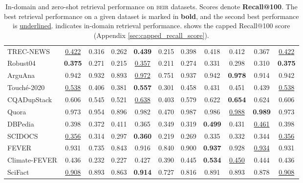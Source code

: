 \documentclass{article}
\newcommand{\custo}[1]{\textsc{\normalsize #1}}
\newcommand{\beir}{\custo{beir}\xspace}
\begin{document}
\begin{table*}[t!]
{\begin{tabular}{l | c | c c c | c c c c | c | c}
   TREC-NEWS     & \underline{0.422} & 0.316 & 0.262 & \textbf{0.439} & 0.215 & 0.398 & 0.418 & 0.412 & 0.367 & \underline{0.422} \\
   Robust04      & \textbf{0.375} & 0.271 & 0.215 & \underline{0.357} & 0.211 & 0.274 & 0.331 & 0.298 & 0.310 & \textbf{0.375} \\ \midrule
   ArguAna       & 0.942 & 0.932 & 0.893 & \underline{0.972} & 0.751 & 0.937 & 0.942 & \textbf{0.978} & 0.914 & 0.942 \\  
   Touch\'e-2020 & \underline{0.538} & 0.406 & 0.381 & \textbf{0.557} & 0.301 & 0.458 & 0.431 & 0.451 & 0.439 & \underline{0.538} \\ \midrule 
   CQADupStack   & 0.606 & 0.545 & 0.521 & \underline{0.638} & 0.403 & 0.579 & 0.622 & \textbf{0.654} & 0.624 & 0.606 \\
   Quora         & 0.973 & 0.954 & 0.896 & 0.982 & 0.470 & 0.987 & 0.986 & \underline{0.988} & \textbf{0.989} & 0.973 \\ \midrule
   DBPedia       & 0.398 & 0.372 & 0.411 & 0.365 & 0.349 & 0.319 & \textbf{0.499} & 0.431 & \underline{0.461} & 0.398 \\ \midrule
   SCIDOCS       & \underline{0.356} & 0.314 & 0.297 & \textbf{0.360} & 0.219 & 0.269 & 0.335 & 0.332 & 0.344 & \underline{0.356} \\ \midrule
   FEVER         & 0.931 & 0.735 & 0.843 & 0.916 & 0.840 & 0.900 & \textbf{0.937} & 0.928 & \underline{0.934} & 0.931 \\ 
   Climate-FEVER & 0.436 & 0.232 & 0.227 & 0.427 & 0.390 & 0.445 & \textbf{0.534} & \underline{0.450} & 0.444 & 0.436 \\  
   SciFact       & \underline{0.908} & 0.893 & 0.863 & \textbf{0.914} & 0.727 & 0.816 & 0.891 & 0.893 & 0.878 & \underline{0.908} \\
    \bottomrule
    \end{tabular}}
    \caption{In-domain and zero-shot retrieval performance on \beir datasets. Scores denote \textbf{Recall@100}. The best retrieval performance on a given dataset is marked in \textbf{bold}, and the second best performance is \underline{underlined}.  indicates in-domain retrieval performance.  shows the capped Recall@100 score (Appendix \ref{sec:capped_recall_score}). \vspace{-5mm}}
    \label{tab:results-recall}
\end{table*}
\end{document}
